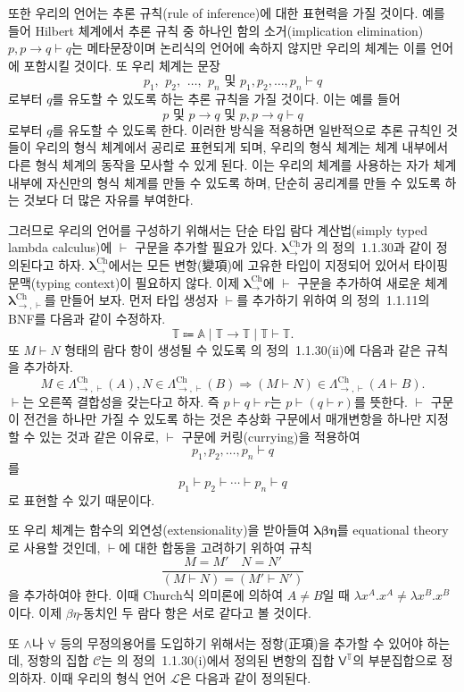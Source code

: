 \documentclass[10pt,twocolumn]{article}
\theoremstyle{definition}
\newcommand{\lch}{\bm\lambda_\to^{\text{Ch}}}
\newcommand{\lchh}{\bm\lambda_{\to,\vdash}^{\text{Ch}}}
\newcommand{\Lchh}{\Lambda_{\to,\vdash}^{\text{Ch}}}
\begin{document}
또한 우리의 언어는 추론 규칙(rule of inference)에 대한 표현력을 가질 것이다. 예를 들어 Hilbert 체계에서 추론 규칙 중 하나인 함의 소거(implication elimination) $p, p\to q\vdash q$는 메타문장이며 논리식의 언어에 속하지 않지만 우리의 체계는 이를 언어에 포함시킬 것이다. 또 우리 체계는 문장
$$p_1,\ \,p_2,\ \,\ldots,\ \,p_n\text{\ \ 및\ \ }p_1, p_2, \ldots, p_n\vdash q$$
로부터 $q$를 유도할 수 있도록 하는 추론 규칙을 가질 것이다. 이는 예를 들어
$$p\text{\ \ 및\ \ }p\to q\text{\ \ 및\ \ }p, p\to q\vdash q$$
로부터 $q$를 유도할 수 있도록 한다. 이러한 방식을 적용하면 일반적으로 추론 규칙인 것들이 우리의 형식 체계에서 공리로 표현되게 되며, 우리의 형식 체계는 체계 내부에서 다른 형식 체계의 동작을 모사할 수 있게 된다. 이는 우리의 체계를 사용하는 자가 체계 내부에 자신만의 형식 체계를 만들 수 있도록 하며, 단순히 공리계를 만들 수 있도록 하는 것보다 더 많은 자유를 부여한다.

그러므로 우리의 언어를 구성하기 위해서는 단순 타입 람다 계산법(simply typed lambda calculus)에 $\vdash$ 구문을 추가할 필요가 있다. $\lch$가 \cite{luswt}의 정의~1.1.30과 같이 정의된다고 하자. $\lch$에서는 모든 변항(變項)에 고유한 타입이 지정되어 있어서 타이핑 문맥(typing context)이 필요하지 않다. 이제 $\lch$에 $\vdash$ 구문을 추가하여 새로운 체계 $\lchh$를 만들어 보자. 먼저 타입 생성자 $\vdash$를 추가하기 위하여 \cite{luswt}의 정의~1.1.11의 BNF를 다음과 같이 수정하자.
$$\mathds T \Coloneqq \mathbb A\mid\mathds T\to\mathds T\mid\mathds T\vdash\mathds T.$$
또 $M\vdash N$ 형태의 람다 항이 생성될 수 있도록 \cite{luswt}의 정의~1.1.30(ii)에 다음과 같은 규칙을 추가하자.
$$M\in\Lchh(A), N\in\Lchh(B)\Rightarrow (M\vdash N)\in\Lchh(A\vdash B).$$
$\vdash$는 오른쪽 결합성을 갖는다고 하자. 즉 $p\vdash q\vdash r$는 $p\vdash (q\vdash r)$를 뜻한다. $\vdash$ 구문이 전건을 하나만 가질 수 있도록 하는 것은 추상화 구문에서 매개변항을 하나만 지정할 수 있는 것과 같은 이유로, $\vdash$ 구문에 커링(currying)을 적용하여
$$p_1, p_2, \ldots, p_n\vdash q$$
를
$$p_1 \vdash p_2\vdash\cdots\vdash p_n\vdash q$$
로 표현할 수 있기 때문이다.

또 우리 체계는 함수의 외연성(extensionality)을 받아들여 $\bm{\lambda\beta\eta}$를 equational theory로 사용할 것인데, $\vdash$에 대한 합동을 고려하기 위하여 규칙
$$\dfrac{M=M'\quad N=N'}{(M\vdash N)=(M'\vdash N')}$$
을 추가하여야 한다. 이때 Church식 의미론에 의하여 $A\ne B$일 때 $\lambda x^A.x^A\ne\lambda x^B.x^B$이다. 이제 $\beta\eta$-동치인 두 람다 항은 서로 같다고 볼 것이다.

또 $\land$나 $\forall$ 등의 무정의용어를 도입하기 위해서는 정항(正項)을 추가할 수 있어야 하는데, 정항의 집합 $\mathcal C$는 \cite{luswt}의 정의~1.1.30(i)에서 정의된 변항의 집합 $\mathsf V^{\mathds T}$의 부분집합으로 정의하자. 이때 우리의 형식 언어 $\mathcal L$은 다음과 같이 정의된다.
\end{document}
